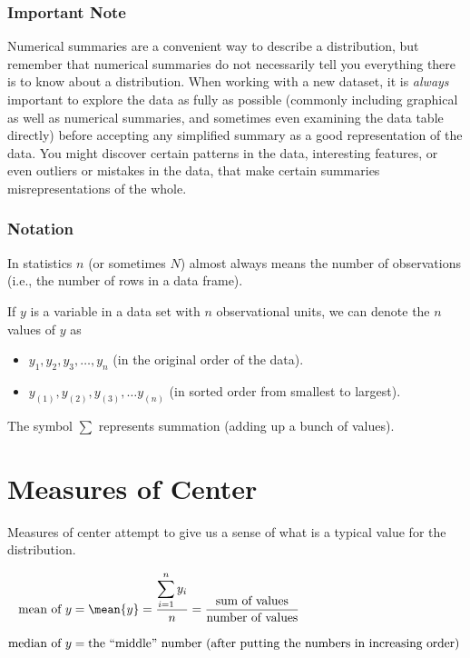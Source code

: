 \documentclass[twoside]{book}\usepackage[]{graphicx}\usepackage[]{xcolor}
\begin{document}
\subsubsection*{Important Note}
Numerical summaries are a convenient way to 
describe a distribution, but remember that numerical summaries 
do not necessarily tell you everything there is to know about a distribution.  When working with a new dataset, it is \emph{always} important to explore the data as fully as possible (commonly including graphical as well as numerical summaries, and sometimes even examining the data table directly) before accepting any simplified summary as a good representation of the data.  You might discover certain patterns in the data, interesting features, or even outliers or mistakes in the data, that make certain summaries misrepresentations of the whole.

\subsubsection*{Notation}
In statistics $n$ (or sometimes $N$) almost always means the number 
of observations (i.e., the number of rows in a data frame).

If $y$ is a variable in a data set with $n$ observational units, we 
can denote the $n$ values of $y$ as 
\begin{itemize}
\item
$y_1, y_2, y_3, \dots, y_n$ (in the original order of the data).
\item
$y_{(1)}, y_{(2)}, y_{(3)}, \dots y_{(n)}$ (in sorted order from smallest to largest).

\end{itemize}

The symbol $\displaystyle \sum$ represents summation (adding up a bunch of values).

\section{Measures of Center}
Measures of center attempt to give us a sense of what is a
typical value for the distribution.


\begin{align*}
\mbox{mean of $y$} 
&=
\mean{y}
= \frac{\displaystyle \sum_{i=1}^{n} y_i}{n}
= \frac{\mbox{sum of values}}{\mbox{number of values}}  
\\[3mm]
\mbox{median of $y$}
&=
\mbox{the ``middle'' number (after putting the numbers in increasing order)
} 
\end{align*}
\end{document}
